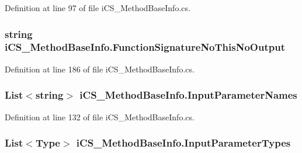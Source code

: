 Definition at line 97 of file i\+C\+S\+\_\+\+Method\+Base\+Info.\+cs.

\hypertarget{classi_c_s___method_base_info_af722eb2e3b161eaefab999b2791e2c9d}{
\subsubsection[{Function\+Signature\+No\+This\+No\+Output}]{\setlength{\rightskip}{0pt plus 5cm}string i\+C\+S\+\_\+\+Method\+Base\+Info.\+Function\+Signature\+No\+This\+No\+Output\hspace{0.3cm}{\ttfamily [get]}}}\label{classi_c_s___method_base_info_af722eb2e3b161eaefab999b2791e2c9d}


Definition at line 186 of file i\+C\+S\+\_\+\+Method\+Base\+Info.\+cs.

\hypertarget{classi_c_s___method_base_info_aa6d84e9dc89f2b96fd3e93e347015f5a}{
\subsubsection[{Input\+Parameter\+Names}]{\setlength{\rightskip}{0pt plus 5cm}List$<$string$>$ i\+C\+S\+\_\+\+Method\+Base\+Info.\+Input\+Parameter\+Names\hspace{0.3cm}{\ttfamily [get]}}}\label{classi_c_s___method_base_info_aa6d84e9dc89f2b96fd3e93e347015f5a}


Definition at line 132 of file i\+C\+S\+\_\+\+Method\+Base\+Info.\+cs.

\hypertarget{classi_c_s___method_base_info_a8b093f052e8a4fa6919edcc3f6bb37f5}{
\subsubsection[{Input\+Parameter\+Types}]{\setlength{\rightskip}{0pt plus 5cm}List$<${\bf Type}$>$ i\+C\+S\+\_\+\+Method\+Base\+Info.\+Input\+Parameter\+Types\hspace{0.3cm}{\ttfamily [get]}}}\label{classi_c_s___method_base_info_a8b093f052e8a4fa6919edcc3f6bb37f5}


